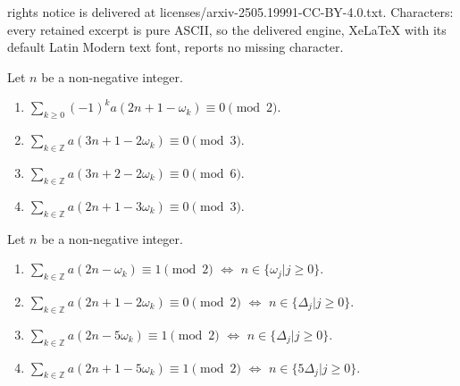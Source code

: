 \documentclass[10pt,a4paper]{amsart}
\begin{document}
rights notice is delivered at licenses/arxiv-2505.19991-CC-BY-4.0.txt. Characters: every retained excerpt is pure ASCII, so the delivered engine, XeLaTeX with its default Latin Modern text font, reports no missing character.
\begin{corollary} \label{Cor4} Let $n$ be a non-negative integer.
\begin{enumerate}
    \item [(a)] $\sum\limits_{k\geq0} (-1)^k a(2n+1-\omega_k)\equiv 0 \pmod 2$.
    \item [(b)] $\sum\limits_{k\in\mathbb{Z}}a(3n+1-2\omega_k) \equiv 0 \pmod 3$.
    \item [(c)] $\sum\limits_{k\in\mathbb{Z}} a(3n+2-2\omega_k)\equiv 0 \pmod 6$.
    \item [(d)] $\sum\limits_{k\in\mathbb{Z}} a(2n+1-3\omega_k) \equiv 0 \pmod 3$.
\end{enumerate}
\end{corollary}

\begin{corollary} \label{Cor3} Let $n$ be a non-negative integer.
\begin{enumerate}
    \item[(a)] $\sum\limits_{k\in\mathbb{Z}}a(2n-\omega_k)\equiv 1 \pmod 2$   $\iff$ $n\in\{\omega_j\vert j\geq0\}$.
    \item[(b)] $\sum\limits_{k\in\mathbb{Z}}a(2n+1-2\omega_k)\equiv 0 \pmod 2$   $\iff$  $n\in\{\Delta_j\vert j\geq0\}$.
    \item[(c)] $\sum\limits_{k\in\mathbb{Z}}a(2n-5\omega_k)\equiv 1 \pmod 2$   $\iff$   $n\in\{\Delta_j\vert j\geq0\}$.
    \item[(d)] $\sum\limits_{k\in\mathbb{Z}}a(2n+1-5\omega_k)\equiv 1 \pmod 2$    $\iff$   $n\in\{5\Delta_j\vert j\geq0\}$.
\end{enumerate}
\end{corollary}
\end{document}
